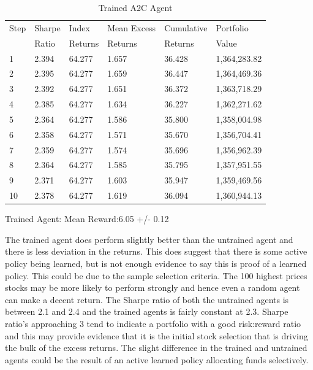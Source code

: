 \documentclass[oneside,12pt]{Classes/RoboticsLaTeX}
\begin{document}
\begin{table}[h]
    \centering
    \begin{tabular}{|l|l|l|l|l|l|}
    \hline
     Step & Sharpe & Index & Mean Excess & Cumulative& Portfolio\\
     \-\ & Ratio & Returns & Returns & Returns & Value\\
    \hline
    1 & 2.394 & 64.277 & 1.657 & 36.428 & 1,364,283.82\\
    \hline
    2 & 2.395 & 64.277 & 1.659 & 36.447 & 1,364,469.36\\
    \hline
    3 & 2.392 & 64.277 & 1.651 & 36.372 & 1,363,718.29\\
    \hline
    4 & 2.385 & 64.277 & 1.634 & 36.227 & 1,362,271.62\\
    \hline
    5 & 2.364 & 64.277 & 1.586 & 35.800 & 1,358,004.98\\
    \hline
    6 & 2.358 & 64.277 & 1.571 & 35.670 & 1,356,704.41\\
    \hline
    7 & 2.359 & 64.277 & 1.574 & 35.696 & 1,356,962.39\\
    \hline
    8 & 2.364 & 64.277 & 1.585 & 35.795 & 1,357,951.55\\
    \hline
    9 & 2.371 & 64.277 & 1.603 & 35.947 & 1,359,469.56\\
    \hline
    10 & 2.378 & 64.277 & 1.619 & 36.094 & 1,360,944.13\\
    \hline
    \end{tabular}
    \caption{Trained A2C Agent}
    \label{table:trained}
\end{table}
Trained Agent: Mean Reward:6.05 +/- 0.12

The trained agent does perform slightly better than the untrained agent and there is less deviation in the returns. This does suggest that there is some active policy being learned, but is not enough evidence to say this is proof of a learned policy.
This could be due to the sample selection criteria. The 100 highest prices stocks may be more likely to perform strongly and hence even a random agent can make a decent return. The Sharpe ratio of both the untrained agents is between 2.1 and 2.4 and the trained agents is fairly constant at 2.3. Sharpe ratio's approaching 3 tend to indicate a portfolio with a good risk:reward ratio and this may provide evidence that it is the initial stock selection that is driving the bulk of the excess returns.  The slight difference in the trained and untrained agents could be the result of an active learned policy allocating funds selectively.
\end{document}
